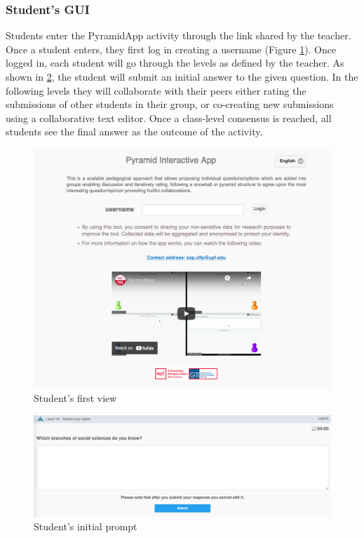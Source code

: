 \subsubsection{Student's GUI}
Students enter the PyramidApp activity through the link shared by the teacher. Once a student enters, they first log in creating a username (Figure \ref{fig:P6}). Once logged in, each student will go through the levels as defined by the teacher. As shown in \ref{fig:P7}, the student will submit an initial answer to the given question. In the following levels they will collaborate with their peers either rating the submissions of other students in their group, or co-creating new submissions using a collaborative text editor. Once a class-level consensus is reached, all students see the final answer as the outcome of the activity.
\begin{figure}[!h]
    \includegraphics[clip,width=\columnwidth]{Figures/pyramidapp6.png}%
\caption{Student's first view}
\label{fig:P6}
\end{figure}
\begin{figure}[!h]
    \includegraphics[clip,width=\columnwidth]{Figures/pyramidapp7.png}%
\caption{Student's initial prompt}
\label{fig:P7}
\end{figure}

